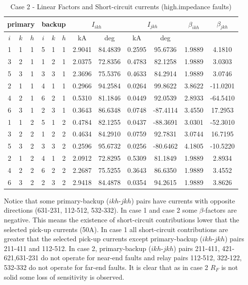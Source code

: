 \documentclass[letterpaper, 10 pt, conference]{IEEEtran}
\begin{document}
  \begin{table}[hbt!]\centering\label{kappas2}
\begin{tabular}{ccc|ccc|cc|cc|c|c}\hline
 \multicolumn{3}{c|}{primary}  &  \multicolumn{3}{|c|}{backup}  &  \multicolumn{2}{|c|}{$I_{ikh}$}
  &  \multicolumn{2}{|c|}{$I_{jkh}$} & $\beta_{ikh} $  &  $\beta_{jkh}$\\\hline
$i$ &   $k$&    $h$     &  $i$ &   $k$&    $h$     & kA & deg & kA & deg & & \\\hline
1	&	1	&	1	&	5	&	1	&	1	&	2.9041	&	84.4839	&	0.2595	&	95.6736	&	1.9889	&	4.1810	\\	
3	&	2	&	1	&	1	&	2	&	1	&	2.0375	&	72.8356	&	0.4783	&	82.1258	&	1.9889	&	3.0303	\\	
5	&	3	&	1	&	3	&	3	&	1	&	2.3696	&	75.5376	&	0.4633	&	84.2914	&	1.9889	&	3.0746	\\	
2	&	1	&	1	&	4	&	1	&	1	&	0.2966	&	94.2584	&	0.0264	&	99.8622	&	3.8622	&	-11.0201	\\	
4	&	2	&	1	&	6	&	2	&	1	&	0.5310	&	81.1846	&	0.0449	&	92.0539	&	2.8933	&	-64.5410	\\	
6	&	3	&	1	&	2	&	3	&	1	&	0.3643	&	86.6348	&	0.0748	&	-87.4114	&	3.4550	&	17.2953	\\	
1	&	1	&	2	&	5	&	1	&	2	&	0.4784	&	82.1255	&	0.0437	&	-88.3691	&	3.0301	&	-52.3010	\\	
3	&	2	&	2	&	1	&	2	&	2	&	0.4634	&	84.2910	&	0.0759	&	92.7831	&	3.0744	&	16.7195	\\	
5	&	3	&	2	&	3	&	3	&	2	&	0.2596	&	95.6732	&	0.0256	&	-80.6462	&	4.1805	&	-10.5220	\\	
2	&	1	&	2	&	4	&	1	&	2	&	2.0912	&	72.8295	&	0.5309	&	81.1849	&	1.9889	&	2.8934	\\	
4	&	2	&	2	&	6	&	2	&	2	&	2.2687	&	75.5255	&	0.3643	&	86.6350	&	1.9889	&	3.4552	\\	
6	&	3	&	2	&	2	&	3	&	2	&	2.9418	&	84.4878	&	0.0354	&	94.2615	&	1.9889	&	3.8626	\\		
	\hline
  \end{tabular}
  \caption{Case 2 - Linear Factors and Short-circuit currents (high.impedance faults)}
\end{table}

Notice that some primary-backup ($ikh$-$jkh$) pairs have currents with opposite directions (631-231,
112-512,  532-332). In case 1 and case 2 some  $\beta$-factors
are negative. This means the existence of short-circuit contributions lower
that the selected pick-up currents (50A).  In case 1 all short-circuit contributions are greater
that the selected pick-up currents except primary-backup ($ikh$-$jkh$) pairs 211-411 and 112-512.
In  case 2, primary-backup ($ikh$-$jkh$) pairs 211-411,
421-621,631-231 do not operate for near-end faults and relay pairs 112-512, 322-122, 532-332 do not operate for far-end faults. It is clear that as in case 2 $R_F$ is not solid some loss of sensitivity is observed.
\end{document}
